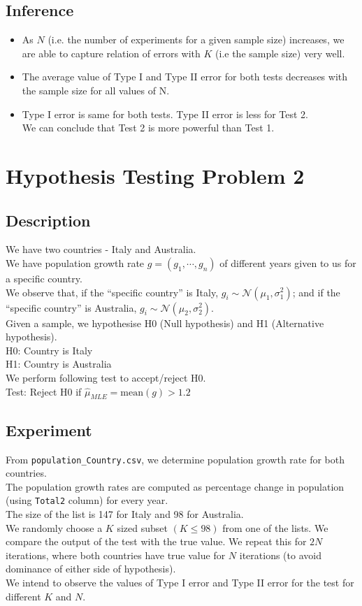 \documentclass[fleqn, 11pt]{article}
\begin{document}
\subsection{Inference}
\begin{itemize}
    \item As $N$ (i.e. the number of experiments for a given sample size) increases, we are able to capture relation of errors with $K$ (i.e the sample size) very well.
    \item The average value of Type I and Type II error for both tests decreases with the sample size for all values of N.
    \item Type I error is same for both tests. Type II error is less for Test 2. \\
          We can conclude that Test 2 is more powerful than Test 1.
\end{itemize}


\newpage
\section{Hypothesis Testing Problem 2}
\setcounter{figure}{0}
\subsection{Description}
We have two countries - Italy and Australia. \\
We have population growth rate $g = (g_1, \cdots ,g_n)$ of different years given to us for a specific country. \\
We observe that, if the ``specific country'' is Italy, $g_i \sim \mathcal{N}(\mu_1, \sigma_1^2)$; and if the ``specific country'' is Australia, $g_i \sim \mathcal{N}(\mu_2, \sigma_2^2)$. \\
Given a sample, we hypothesise H0 (Null hypothesis) and H1 (Alternative hypothesis). \\
H0: Country is Italy \\
H1: Country is Australia \\
We perform following test to accept/reject H0. \\
Test: Reject H0 if $\hat{\mu}_{MLE} = \mathrm{mean}(g) > 1.2$

\subsection{Experiment}
From \verb!population_Country.csv!, we determine population growth rate for both countries. \\
The population growth rates are computed as percentage change in population (using \verb!Total2! column) for every year. \\
The size of the list is 147 for Italy and 98 for Australia. \\
We randomly choose a $K$ sized subset $(K \le 98)$ from one of the lists. We compare the output of the test with the true value. We repeat this for $2N$ iterations, where both countries have true value for $N$ iterations (to avoid dominance of either side of hypothesis). \\
We intend to observe the values of Type I error and Type II error for the test for different $K$ and $N$.
\end{document}
